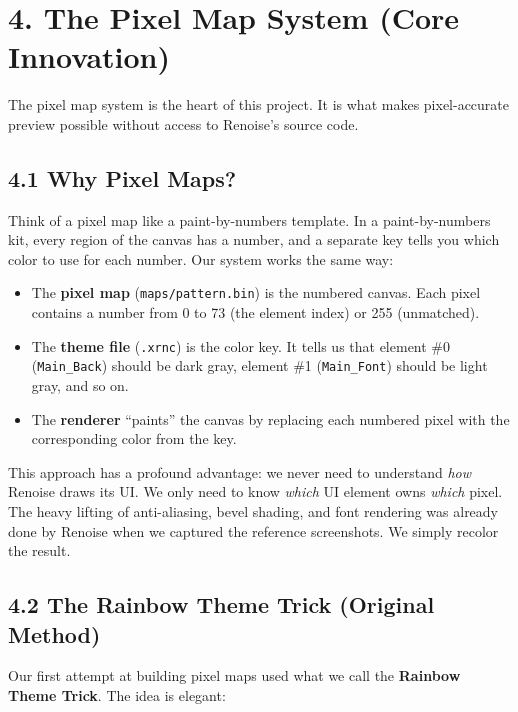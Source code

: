 \documentclass[
  11pt,
  oneside]{report}
\providecommand{\tightlist}{%
  \setlength{\itemsep}{0pt}\setlength{\parskip}{0pt}}
\begin{document}
\section{4. The Pixel Map System (Core
Innovation)}\label{the-pixel-map-system-core-innovation}

The pixel map system is the heart of this project. It is what makes
pixel-accurate preview possible without access to Renoise's source code.

\subsection{4.1 Why Pixel Maps?}\label{why-pixel-maps}

Think of a pixel map like a paint-by-numbers template. In a
paint-by-numbers kit, every region of the canvas has a number, and a
separate key tells you which color to use for each number. Our system
works the same way:

\begin{itemize}
\tightlist
\item
  The \textbf{pixel map} (\texttt{maps/pattern.bin}) is the numbered
  canvas. Each pixel contains a number from 0 to 73 (the element index)
  or 255 (unmatched).
\item
  The \textbf{theme file} (\texttt{.xrnc}) is the color key. It tells us
  that element \#0 (\texttt{Main\_Back}) should be dark gray, element
  \#1 (\texttt{Main\_Font}) should be light gray, and so on.
\item
  The \textbf{renderer} ``paints'' the canvas by replacing each numbered
  pixel with the corresponding color from the key.
\end{itemize}

This approach has a profound advantage: we never need to understand
\emph{how} Renoise draws its UI. We only need to know \emph{which} UI
element owns \emph{which} pixel. The heavy lifting of anti-aliasing,
bevel shading, and font rendering was already done by Renoise when we
captured the reference screenshots. We simply recolor the result.

\subsection{4.2 The Rainbow Theme Trick (Original
Method)}\label{the-rainbow-theme-trick-original-method}

Our first attempt at building pixel maps used what we call the
\textbf{Rainbow Theme Trick}. The idea is elegant:
\end{document}

